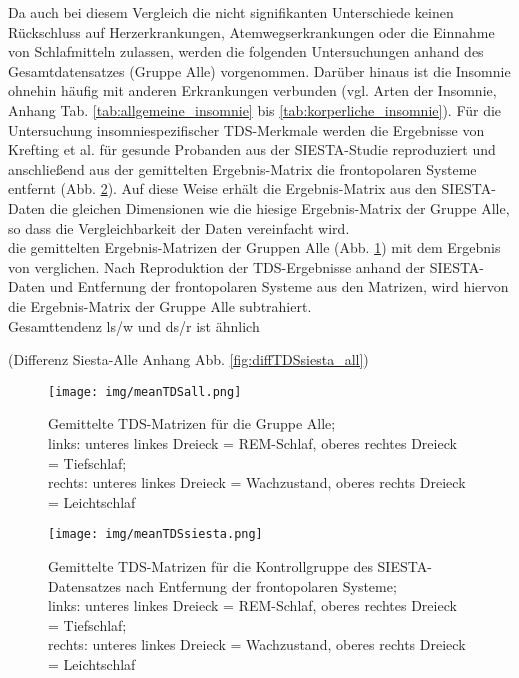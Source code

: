 Da auch bei diesem Vergleich die nicht signifikanten Unterschiede keinen Rückschluss auf Herzerkrankungen, Atemwegserkrankungen oder die Einnahme von Schlafmitteln zulassen, werden die folgenden Untersuchungen anhand des Gesamtdatensatzes (Gruppe Alle) vorgenommen. Darüber hinaus ist die Insomnie ohnehin häufig mit anderen Erkrankungen verbunden (vgl. Arten der Insomnie, Anhang Tab. \ref{tab:allgemeine_insomnie} bis \ref{tab:korperliche_insomnie}). Für die Untersuchung insomniespezifischer \acs{TDS}-Merkmale werden die Ergebnisse von Krefting et al. \parencite{krefting_age_2017} für gesunde Probanden aus der SIESTA-Studie reproduziert und anschließend aus der gemittelten Ergebnis-Matrix die frontopolaren Systeme entfernt (Abb. \ref{fig:meanTDSsiesta}). Auf diese Weise erhält die Ergebnis-Matrix aus den SIESTA-Daten die gleichen Dimensionen wie die hiesige Ergebnis-Matrix der Gruppe Alle, so dass die Vergleichbarkeit der Daten vereinfacht wird.\\

die gemittelten Ergebnis-Matrizen der Gruppen Alle (Abb. \ref{fig:meanTDSall}) mit dem Ergebnis von  verglichen. Nach Reproduktion der \acs{TDS}-Ergebnisse anhand der SIESTA-Daten und Entfernung der frontopolaren Systeme aus den Matrizen, wird hiervon die Ergebnis-Matrix der Gruppe Alle subtrahiert.\\

Gesamttendenz ls/w und ds/r ist ähnlich

(Differenz Siesta-Alle Anhang Abb. \ref{fig:diffTDSsiesta_all})


\begin{figure}[H]
	\centering
	\texttt{[image: img/meanTDSall.png]}
	\caption[\acs{TDS}-Gruppenergebnis für die Gruppe Alle]{Gemittelte \acs{TDS}-Matrizen für die Gruppe Alle;\\links: unteres linkes Dreieck = \acs{REM}-Schlaf, oberes rechtes Dreieck = Tiefschlaf;\\rechts: unteres linkes Dreieck = Wachzustand, oberes rechts Dreieck = Leichtschlaf}
	\label{fig:meanTDSall}
\end{figure}

\begin{figure}[H]
	\centering
	\texttt{[image: img/meanTDSsiesta.png]}
	\caption[\acs{TDS}-Gruppenergebnis für den SIESTA-Datensatz]{Gemittelte \acs{TDS}-Matrizen für die Kontrollgruppe des SIESTA-Datensatzes nach Entfernung der frontopolaren Systeme;\\links: unteres linkes Dreieck = \acs{REM}-Schlaf, oberes rechtes Dreieck = Tiefschlaf;\\rechts: unteres linkes Dreieck = Wachzustand, oberes rechts Dreieck = Leichtschlaf}
	\label{fig:meanTDSsiesta}
\end{figure}

